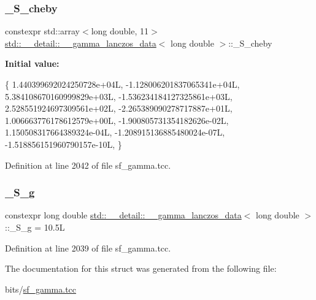 \subsubsection{\texorpdfstring{\+\_\+\+S\+\_\+cheby}{\_S\_cheby}}
{\footnotesize\ttfamily constexpr std\+::array$<$long double, 11$>$ \hyperlink{structstd_1_1____detail_1_1____gamma__lanczos__data}{std\+::\+\_\+\+\_\+detail\+::\+\_\+\+\_\+gamma\+\_\+lanczos\+\_\+data}$<$ long double $>$\+::\+\_\+\+S\+\_\+cheby\hspace{0.3cm}{\ttfamily [static]}}

{\bfseries Initial value\+:}
\begin{DoxyCode}
\{
     1.440399692024250728e+04L,
    -1.128006201837065341e+04L,
     5.384108670160999829e+03L,
    -1.536234184127325861e+03L,
     2.528551924697309561e+02L,
    -2.265389090278717887e+01L,
     1.006663776178612579e+00L,
    -1.900805731354182626e-02L,
     1.150508317664389324e-04L,
    -1.208915136885480024e-07L,
    -1.518856151960790157e-10L,
      \}
\end{DoxyCode}


Definition at line 2042 of file sf\+\_\+gamma.\+tcc.

\mbox{\label{structstd_1_1____detail_1_1____gamma__lanczos__data_3_01long_01double_01_4_af86428283206e8b9bd3dc5709855c901}} 
\subsubsection{\texorpdfstring{\+\_\+\+S\+\_\+g}{\_S\_g}}
{\footnotesize\ttfamily constexpr long double \hyperlink{structstd_1_1____detail_1_1____gamma__lanczos__data}{std\+::\+\_\+\+\_\+detail\+::\+\_\+\+\_\+gamma\+\_\+lanczos\+\_\+data}$<$ long double $>$\+::\+\_\+\+S\+\_\+g = 10.\+5L\hspace{0.3cm}{\ttfamily [static]}}



Definition at line 2039 of file sf\+\_\+gamma.\+tcc.



The documentation for this struct was generated from the following file\+:\begin{DoxyCompactItemize}
\item 
bits/\hyperlink{sf__gamma_8tcc}{sf\+\_\+gamma.\+tcc}\end{DoxyCompactItemize}
